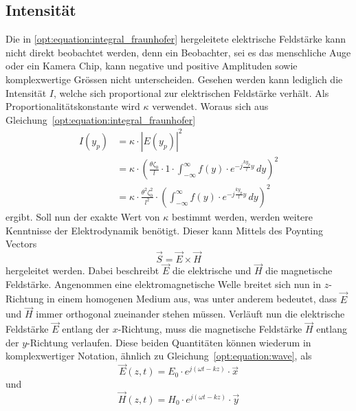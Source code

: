 \subsection{Intensität}
\label{opt:sec:intensity}
Die in \ref{opt:equation:integral_fraunhofer} hergeleitete elektrische Feldstärke kann nicht direkt beobachtet werden, denn ein Beobachter, sei es das menschliche Auge oder ein Kamera Chip, kann negative und positive Amplituden sowie komplexwertige Grössen nicht unterscheiden.
Gesehen werden kann lediglich die Intensität $I$, welche sich proportional zur elektrischen Feldstärke verhält.
Als Proportionalitätskonstante wird $\kappa$ verwendet.
Woraus sich aus Gleichung~\ref{opt:equation:integral_fraunhofer}
\begin{align}
I(y_p)
&=
\kappa \cdot |E(y_p)|^2
\\
&=
\kappa \cdot \left(\frac{\theta\zeta_0}{l} \cdot 1 \cdot \int_{-\infty}^{\infty}f(y)\cdot e^{-j\frac{ky_p}{l}y} \,dy\right)^2
\\
&=
\kappa \cdot \frac{\theta^2\zeta_0^2}{l^2}\cdot \left(\int_{-\infty}^{\infty}f(y)\cdot e^{-j\frac{ky_p}{l}y} \,dy\right)^2
\label{opt:equation:integral_intensity}
\end{align}
ergibt. Soll nun der exakte Wert von $\kappa$ bestimmt werden, werden weitere Kenntnisse der Elektrodynamik benötigt.
Dieser kann Mittels des Poynting Vectors
\begin{equation}
\vec{S} = \vec{E} \times \vec{H}
\label{opt:equation:poynting}
\end{equation}
hergeleitet werden.
Dabei beschreibt $\vec{E}$ die elektrische und $\vec{H}$ die magnetische Feldstärke.
Angenommen eine elektromagnetische Welle breitet sich nun in $z$-Richtung in einem homogenen Medium aus, was unter anderem bedeutet, dass $\vec{E}$ und $\vec{H}$ immer orthogonal zueinander stehen müssen.
Verläuft nun die elektrische Feldstärke $\vec{E}$ entlang der $x$-Richtung, muss die magnetische Feldstärke $\vec{H}$ entlang der $y$-Richtung verlaufen.
Diese beiden Quantitäten können wiederum in komplexwertiger Notation, ähnlich zu Gleichung~\ref{opt:equation:wave}, als
\begin{equation}
\vec{E}(z,t)
=
E_0 \cdot e^{j(\omega t-k z)} \cdot \vec{x}
\label{opt:equation:wave_electric_field}
\end{equation}
und
\begin{equation}
\vec{H}(z,t)
=
H_0 \cdot e^{j(\omega t-k z)} \cdot \vec{y}
\label{opt:equation:wave_magnetic_field}
\end{equation}
